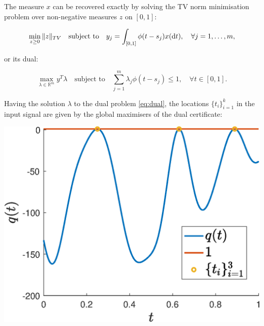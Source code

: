 \documentclass[a0paper,portrait,fontscale=0.35]{baposter}
\theoremstyle{plain}
\theoremstyle{plain}
\theoremstyle{definition}
\theoremstyle{plain}
\theoremstyle{definition}
\begin{document}
\begin{poster}
{  \begin{minipage}[t]{\textwidth}
    The measure $x$ can be recovered exactly by solving 
    the TV norm minimisation problem over non-negative
    measures $z$ on $[0,1]$:
    \begin{tcolorbox}[colback=teal!10!white,colframe=white]
      \begin{equation}
        \min_{z \geq 0} \|z\|_{TV} 
        \quad \text{subject to} \quad
        y_j = \int_{[0,1]} \phi(t-s_j)x(\dif t),
        \quad
        \forall j=1,\ldots,m,
      \end{equation}
    \end{tcolorbox}
    or its dual:
    \begin{tcolorbox}[colback=teal!10!white,colframe=white]
      \begin{equation}
        \max_{\lambda \in \mathbb{R}^m}
        y^T \lambda 
        \quad \text{subject to} \quad
        \sum_{j=1}^m \lambda_j \phi(t-s_j) \leq 1,
        \quad \forall t \in [0,1].
        \label{eq:dual}
      \end{equation}
    \end{tcolorbox}
  \end{minipage}
  \begin{minipage}[t]{\textwidth}
    \begin{minipage}[h]{0.53\textwidth} 
      Having the solution $\lambda$ to the dual problem \eqref{eq:dual},
      the locations $\{t_i\}_{i=1}^k$ in the input signal
      are given by the global maximisers of the dual certificate:
      \vspace{-0.5em}
      \begin{center}
      \end{center}
    \end{minipage}
    \begin{minipage}[h]{0.44\textwidth}
      \centering
      \includegraphics[height=0.097\textheight]{img/dual_certif.eps}
    \end{minipage}
  \end{minipage} 
}


\end{poster}
\end{document}
